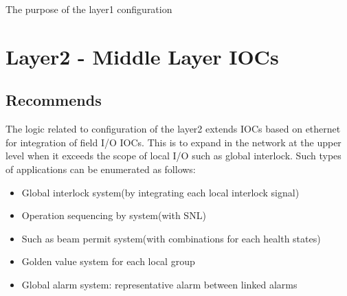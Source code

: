 \documentclass[11pt
  , letterpaper
  , article
  , oneside
  , showtrims
]{memoir}
\begin{document}
The purpose of the layer1 configuration ~~

\section{Layer2 - Middle Layer IOCs}
\subsection{Recommends}
The logic related to configuration of the layer2 extends IOCs based on ethernet for integration of field I/O IOCs. This is to expand in the network at the upper level when it exceeds the scope of local I/O such as global interlock.
Such types of applications can be enumerated as follows:
\begin{itemize}
	\item Global interlock system(by integrating each local interlock signal)
	\item Operation sequencing by system(with SNL)
	\item Such as beam permit system(with combinations for each health states)
	\item Golden value system for each local group
	\item Global alarm system: representative alarm between linked alarms
\end{itemize}

\newpage
\end{document}
